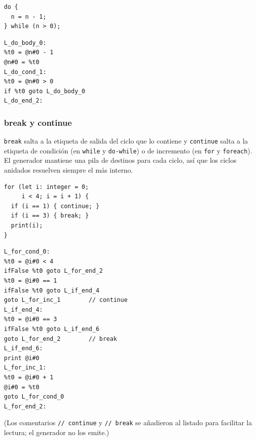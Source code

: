 \documentclass[11pt,a4paper]{article}
\begin{document}
\vspace{0.4em}
\noindent
\begin{minipage}[t]{0.34\textwidth}
\begin{lstlisting}[language=Compiscript,style=sinnumero]
do {
  n = n - 1;
} while (n > 0);
\end{lstlisting}
\end{minipage}\hfill
\begin{minipage}[t]{0.60\textwidth}
\begin{lstlisting}[language=TAC,style=sinnumero]
L_do_body_0:
%t0 = @n#0 - 1
@n#0 = %t0
L_do_cond_1:
%t0 = @n#0 > 0
if %t0 goto L_do_body_0
L_do_end_2:
\end{lstlisting}
\end{minipage}

\subsubsection{break y continue}

\texttt{break} salta a la etiqueta de salida del ciclo que lo contiene y
\texttt{continue} salta a la etiqueta de condición (en \texttt{while} y
\texttt{do-while}) o de incremento (en \texttt{for} y \texttt{foreach}). El
generador mantiene una pila de destinos para cada ciclo, así que los ciclos
anidados resuelven siempre el más interno.

\noindent
\begin{minipage}[t]{0.40\textwidth}
\begin{lstlisting}[language=Compiscript,style=sinnumero]
for (let i: integer = 0;
     i < 4; i = i + 1) {
  if (i == 1) { continue; }
  if (i == 3) { break; }
  print(i);
}
\end{lstlisting}
\end{minipage}\hfill
\begin{minipage}[t]{0.54\textwidth}
\begin{lstlisting}[language=TAC,style=sinnumero]
L_for_cond_0:
%t0 = @i#0 < 4
ifFalse %t0 goto L_for_end_2
%t0 = @i#0 == 1
ifFalse %t0 goto L_if_end_4
goto L_for_inc_1        // continue
L_if_end_4:
%t0 = @i#0 == 3
ifFalse %t0 goto L_if_end_6
goto L_for_end_2        // break
L_if_end_6:
print @i#0
L_for_inc_1:
%t0 = @i#0 + 1
@i#0 = %t0
goto L_for_cond_0
L_for_end_2:
\end{lstlisting}
\end{minipage}

\noindent(Los comentarios \texttt{// continue} y \texttt{// break} se añadieron
al listado para facilitar la lectura; el generador no los emite.)
\end{document}
